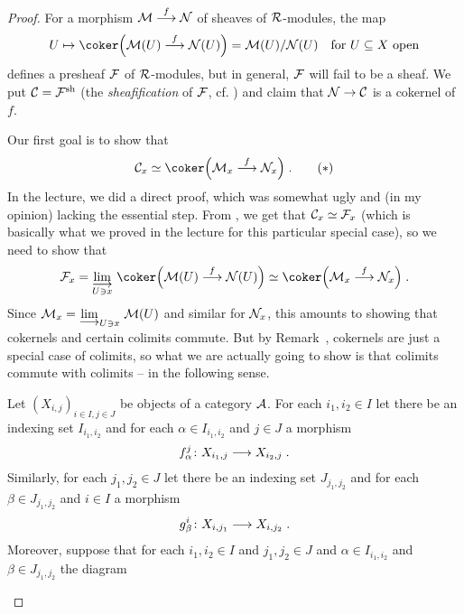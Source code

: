 \documentclass[a4paper,parskip=half,numbers=enddot, DIV=12]{scrreprt}
\begin{document}
\begin{proof}
	For a morphism $\Mm\morphism[f]\Nn$ of sheaves of $\mathcal{R}$-modules, the map 
	\begin{align*}
		U\mapsto \coker\Big(\Mm(U)\morphism[f]\Nn(U)\Big)=\Mm(U)/\Nn(U)\quad\text{for }U\subseteq X\text{ open}
	\end{align*}
	defines a presheaf $\mathcal{F}$ of $\mathcal{R}$-modules, but in general, $\mathcal{F}$ will fail to be a sheaf. We put $\mathcal{C}=\mathcal{F}^{\mathrm{sh}}$ (the \emph{sheafification} of $\mathcal{F}$, cf. \cite[Definition~1.2.3]{alggeo1}) and claim that $\Nn\morphism\Cc$ is a cokernel of $f$.
	
	Our first goal is to show that
	\begin{align}\lbl{eq:SheafCokernel}
		\Cc_x\simeq\coker\Big(\Mm_x\morphism[f]\Nn_x\Big)\;.\tag{$*$}
	\end{align}
	In the lecture, we did a direct proof, which was somewhat ugly and (in my opinion) lacking the essential step. From \cite[Proposition~1.2.1]{alggeo1}, we get that $\mathcal{C}_x\simeq\mathcal{F}_x$ (which is basically what we proved in the lecture for this particular special case), so we need to show that
	\begin{align*}
		\Ff_x=\colimit[U\ni x]\coker\Big(\Mm(U)\morphism[f]\Nn(U)\Big)\simeq \coker\Big(\Mm_x\morphism[f]\Nn_x\Big)\;.
	\end{align*}
	Since $\Mm_x=\colimit[U\ni x]\Mm(U)$ and similar for $\mathcal{N}_x$, this amounts to showing that cokernels and certain colimits commute. But by Remark~, cokernels are just a special case of colimits, so what we are actually going to show is that colimits commute with colimits -- in the following sense.
	\begin{lem}
		Let $(X_{i,j})_{i\in I,j\in J}$ be objects of a category $\mathcal{A}$. For each $i_1,i_2\in I$ let there be an indexing set $I_{i_1,i_2}$ and for each $\alpha\in I_{i_1,i_2}$ and $j\in J$ a morphism
		\begin{align*}
			f_\alpha^j\colon X_{i_1,j}\morphism X_{i_2,j}\;.
		\end{align*}
		Similarly, for each $j_1,j_2\in J$ let there be an indexing set $J_{j_1,j_2}$ and for each $\beta\in J_{j_1,j_2}$ and $i\in I$ a morphism
		\begin{align*}
			g_\beta^i\colon X_{i,j_1}\morphism X_{i,j_2}\;.
		\end{align*}
		Moreover, suppose that for each $i_1,i_2\in I$ and $j_1,j_2\in J$ and $\alpha\in I_{i_1,i_2}$ and $\beta\in J_{j_1,j_2}$ the diagram
		\begin{diagram}

\end{diagram}
\end{lem}
\end{proof}
\end{document}
